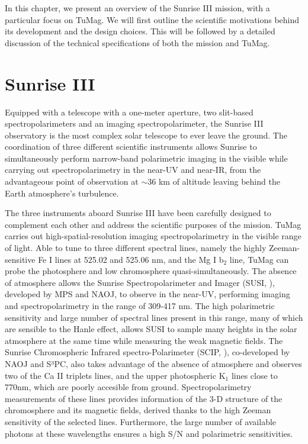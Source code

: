 In this chapter, we present an overview of the Sunrise III mission, with a particular focus on TuMag. We will first outline the scientific motivations behind its development and the design choices. This will be followed by a detailed discussion of the technical specifications of both the mission and TuMag.

\section{Sunrise III}

Equipped with a telescope with a one-meter aperture, two slit-based spectropolarimeters and an imaging spectropolarimeter, the Sunrise III observatory is the most complex solar telescope to ever leave the ground. The coordination of three different scientific instruments allows Sunrise to simultaneously perform narrow-band polarimetric imaging in the visible while carrying out spectropolarimetry in the near-UV and near-IR, from the advantageous point of observation at $\sim$36 km of altitude leaving behind the Earth atmosphere's turbulence. 

The three instruments aboard Sunrise III have been carefully designed to complement each other and address the scientific purposes of the mission. TuMag carries out high-spatial-resolution imaging spectropolarimetry in the visible range of light. Able to tune to three different spectral lines, namely the highly Zeeman-sensitive Fe I lines at 525.02 and 525.06 nm, and the Mg I b$_2$ line, TuMag can probe the photosphere and low chromosphere quasi-simultaneously. The absence of atmosphere allows the Sunrise Spectropolarimeter and Imager (SUSI, \citealt{susi}), developed by MPS and NAOJ, to observe in the near-UV, performing imaging and spectropolarimetry in the range of 309-417 nm. The high polarimetric sensitivity and large number of spectral lines present in this range, many of which are sensible to the Hanle effect, allows SUSI to sample many heights in the solar atmosphere at the same time while measuring the weak magnetic fields. The Sunrise Chromospheric Infrared spectro-Polarimeter (SCIP, \citealt{SCIP}), co-developed by NAOJ and S³PC, also takes advantage of the absence of atmosphere and observes two of the Ca II triplets lines, and the upper photospheric K$_{1}$ lines close to 770nm, which are poorly accesible from ground. Spectropolarimetry measurements of these lines provides information of the 3-D structure of the chromosphere and its magnetic fields, derived thanks to the high Zeeman sensitivity of the selected lines. Furthermore, the large number of available photons at these wavelengths ensures a high S/N and polarimetric sensitivities. 

